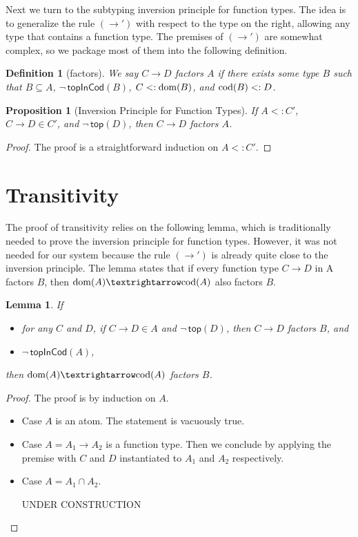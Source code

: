 \documentclass{article}
\newtheorem{lemma}[theorem]{Lemma}
\newtheorem{proposition}[theorem]{Proposition}
\newtheorem{definition}[theorem]{Definition}
\begin{document}
Next we turn to the subtyping inversion principle for function types.
The idea is to generalize the rule $(→')$ with respect to the type on
the right, allowing any type that contains a function type.  The
premises of $(→')$ are somewhat complex, so we package most of them
into the following definition.

\begin{definition}[factors]
  We say $C → D$ \emph{factors} $A$
  if there exists some type $B$ such that
  $B ⊆ A$, $\neg\,\mathsf{topInCod}(B)$, $C <: \mathrm{dom}(B)$, and $\mathrm{cod}(B) <: D$.
\end{definition}

\begin{proposition}[Inversion Principle for Function Types]\label{lem:⊑-fun-inv}
  If $A <: C'$, $C → D ∈ C'$, and $\neg\,\mathsf{top}(D)$, then
  $C → D$ factors $A$.
\end{proposition}
\begin{proof}
  The proof is a straightforward induction on $A <: C'$.
\end{proof}

\section{Transitivity}

The proof of transitivity relies on the following lemma, which is
traditionally needed to prove the inversion principle for function
types. However, it was not needed for our system because the rule
$(→')$ is already quite close to the inversion principle.
The lemma states that if every function type $C → D$ in A
factors $B$, then $\dom{A} → \cod{A}$ also factors $B$.

\begin{lemma}\label{lem:sub-inv-trans}
  If
  \begin{itemize}
  \item for any $C$ and $D$, if $C → D ∈ A$ and $\neg\,\mathsf{top}(D)$,
    then $C → D$ factors $B$, and
  \item $\neg\, \mathsf{topInCod}(A)$,
  \end{itemize}
  then $\dom{A} → \cod{A}$ factors $B$.
\end{lemma}
\begin{proof}
  The proof is by induction on $A$.
  \begin{itemize}
  \item Case $A$ is an atom. The statement is vacuously true.
  \item Case $A = A_1 → A_2$ is a function type. Then we conclude by applying
    the premise with $C$ and $D$ instantiated to $A_1$ and $A_2$ respectively.
  \item Case $A = A_1 ∩ A_2$.

    UNDER CONSTRUCTION
  \end{itemize}
\end{proof}
\end{document}
